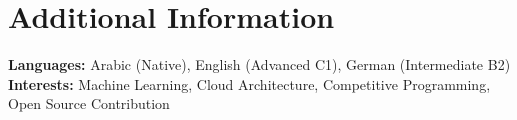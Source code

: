 \documentclass[8pt,a4paper]{article}
\newcommand{\skillsection}[2]{%
    \textbf{#1:} #2\\[-0.02em]
}
\begin{document}

\section{Additional Information}

\skillsection{Languages}{Arabic (Native), English (Advanced C1), German (Intermediate B2)}
\skillsection{Interests}{Machine Learning, Cloud Architecture, Competitive Programming, Open Source Contribution}
\end{document}

